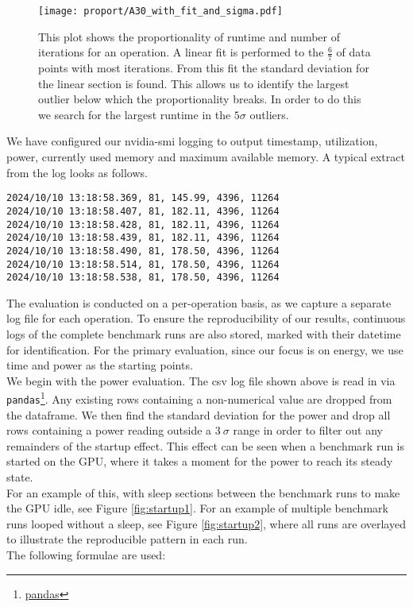 \documentclass[conference]{IEEEtran}
\begin{document}
\begin{figure}
    \centering
    \texttt{[image: proport/A30\_with\_fit\_and\_sigma.pdf]}
    \caption{This plot shows the proportionality of runtime and number of iterations for an operation. A linear fit is performed to the $\frac{6}{7}$ of data points with most iterations. From this fit the standard deviation for the linear section is found. This allows us to identify the largest outlier below which the proportionality breaks. In order to do this we search for the largest runtime in the $5\sigma$ outliers.}
    \label{fig:proport}
\end{figure}

We have configured our nvidia-smi logging to output timestamp, utilization, power, currently used memory and maximum available memory. A typical extract from the log looks as follows.


\begin{footnotesize} %
\begin{verbatim}
2024/10/10 13:18:58.369, 81, 145.99, 4396, 11264
2024/10/10 13:18:58.407, 81, 182.11, 4396, 11264
2024/10/10 13:18:58.428, 81, 182.11, 4396, 11264
2024/10/10 13:18:58.439, 81, 182.11, 4396, 11264
2024/10/10 13:18:58.490, 81, 178.50, 4396, 11264
2024/10/10 13:18:58.514, 81, 178.50, 4396, 11264
2024/10/10 13:18:58.538, 81, 178.50, 4396, 11264
\end{verbatim}
\end{footnotesize}

The evaluation is conducted on a per-operation basis, as we capture a separate log file for each operation. To ensure the reproducibility of our results, continuous logs of the complete benchmark runs are also stored, marked with their datetime for identification. For the primary evaluation, since our focus is on energy, we use time and power as the starting points. \\ 
We begin with the power evaluation. The csv log file shown above is read in via \texttt{pandas}\footnote{\href{https://pandas.pydata.org/}{pandas}}. Any existing rows containing a non-numerical value are dropped from the dataframe. We then find the standard deviation for the power and drop all rows containing a power reading outside a $3 \: \sigma $ range in order to filter out any remainders of the startup effect. This effect can be seen when a benchmark run is started on the GPU, where it takes a moment for the power to reach its steady state. \\
For an example of this, with sleep sections between the benchmark runs to make the GPU idle, see Figure \ref{fig:startup1}. For an example of multiple benchmark runs looped without a sleep, see Figure \ref{fig:startup2}, where all runs are overlayed to illustrate the reproducible pattern in each run.\\
The following formulae are used:
\end{document}
